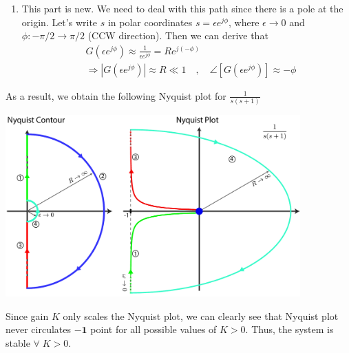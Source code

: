 \documentclass{article}
\begin{document}
\begin{enumerate}
  \item This part is new. We need to deal with this path   since there is a pole at the origin. 
  	Let's write $s$ in polar coordinates
     $s = \epsilon e^{j \phi}$, where $\epsilon \to 0$ and $\phi :
     -\pi/2 \to \pi/2$ (CCW direction).  Then  we can derive that  
   \begin{align*}
     & G \left( \epsilon e^{j \phi} \right) \approx \frac{1}{\epsilon e^{j
        \phi}} = R e^{j (-\phi)}
       \\
    &\Rightarrow | G \left(\epsilon e^{j \phi} \right) | \approx
     R \ll 1
   \quad , \quad \angle [ G \left( \epsilon e^{j \phi} \right) ] \approx -\phi
   \end{align*}
\end{enumerate}

As a result, we obtain the following Nyquist plot for
$ \frac{1}{s (s+1)}$

\vspace{6 pt}

  \begin{minipage}[h]{1\linewidth}
    \begin{center}
      \includegraphics[width=0.85\textwidth]{ex5}
    \end{center}
  \end{minipage}

\vspace{6 pt}

Since gain $K$ only scales the Nyquist plot, we can clearly see that 
Nyquist plot never circulates $\mathbf{-1}$ point for all possible values of $K > 0$.
Thus, the system is stable $\forall \; K > 0$.
 
\end{document}

